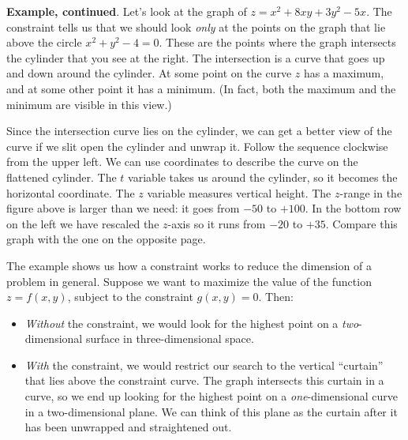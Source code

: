 {{{{\vspace{8pt}  

\newpage




{\bf Example, continued}.  Let's look at the graph of $z = x^2 + 8 x y + 3 y^2 - 5x$.   The constraint tells us that we should look {\em only\/} at the points on the graph that lie above the circle $x^2 + y^2 - 4 = 0$.  These are the points where the graph intersects the cylinder that you see at the right.  The intersection is a curve that goes up and down around the cylinder.  At some point on the curve $z$ has a maximum, and at some other point it has a minimum.   (In fact, both the maximum and the minimum are visible in this view.) 
\vspace{3pt}

        Since the intersection curve lies on the cylinder, 
we can get a better view of the curve if we slit open the cylinder and unwrap it.  Follow the sequence clockwise from the upper left.  We can use coordinates to describe the curve on the flattened cylinder.  The $t$ variable takes us around the cylinder, so it becomes the horizontal coordinate.  The $z$ variable measures vertical height.  The $z$-range in the figure above is larger than we need: it goes from $-50$ to $+100$.  In the bottom row on the left we have rescaled the $z$-axis so it runs from $-20$ to $+35$.   Compare this graph with the one on the opposite page.
        

\newpage

        The example shows us how a constraint works 
to reduce the dimension of a problem in general.  Suppose we want to maximize the value of the function $z = f(x, y)$, subject to the constraint $g(x, y) = 0$.  Then:
        \begin{itemize}
\item
{\em Without\/} the constraint, we would look for the highest point on a {\em two\/}-dimensional surface in three-dimensional space.
\item
{\em With\/} the constraint, we would restrict our search to the vertical ``curtain'' that lies above the constraint curve.   The graph intersects this curtain in a curve, so we end up looking for the highest point on a {\em one\/}-dimensional curve in a two-dimensional plane.  We can think of this plane as the curtain after it has been unwrapped and straightened out.
        \end{itemize}

}}}}
